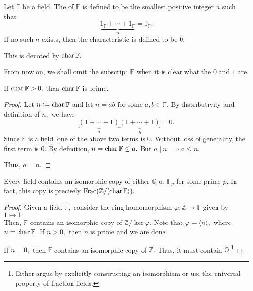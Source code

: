 \begin{defn}%
    Let $\mathbb{F}$ be a field. The  of $\mathbb{F}$ is defined to be the smallest positive integer $n$ such that
    \begin{equation*} 
        \underbrace{1_{\mathbb{F}} + \cdots + 1_{\mathbb{F}}}_{n} = 0_{\mathbb{F}}.
    \end{equation*}
    If no such $n$ exists, then the characteristic is defined to be $0.$ 

    This is denoted by $\operatorname{char} \mathbb{F}.$
\end{defn}

From now on, we shall omit the subscript $\mathbb{F}$ when it is clear what the $0$ and $1$ are.

\begin{prop}
    If $\operatorname{char} \mathbb{F} > 0,$ then $\operatorname{char} \mathbb{F}$ is prime.
\end{prop}
\begin{proof} 
    Let $n \vcentcolon= \operatorname{char} \mathbb{F}$ and let $n = ab$ for some $a, b \in \mathbb{F}.$ By distributivity and definition of $n,$ we have
    \begin{equation*} 
        \underbrace{(1 + \cdots + 1)}_{a}\underbrace{(1 + \cdots + 1)}_{b} = 0.
    \end{equation*}
    Since $\mathbb{F}$ is a field, one of the above two terms is $0.$ Without loss of generality, the first term is $0.$ By definition, $n = \operatorname{char} \mathbb{F} \le a.$ But $a \mid n \implies a \le n.$

    Thus, $a = n.$
\end{proof}

\begin{prop}
    Every field contains an isomorphic copy of either $\mathbb{Q}$ or $\mathbb{F}_p$ for some prime $p.$ In fact, this copy is precisely $\operatorname{Frac}(\mathbb{Z}/\langle \operatorname{char}\mathbb{F}\rangle).$
\end{prop}
\begin{proof} 
    Given a field $\mathbb{F},$ consider the ring homomorphism $\varphi : \mathbb{Z} \to \mathbb{F}$ given by $1 \mapsto 1.$ \\
    Then, $\mathbb{F}$ contains an isomorphic copy of $\mathbb{Z}/\ker \varphi.$ Note that $\varphi = \langle n\rangle,$ where $n = \operatorname{char}\mathbb{F}.$ If $n > 0,$ then $n$ is prime and we are done.

    If $n = 0,$ then $\mathbb{F}$ contains an isomorphic copy of $\mathbb{Z}.$ Thus, it must contain $\mathbb{Q}.$\footnote{Either argue by explicitly constructing an isomorphism or use the universal property of fraction fields.}
\end{proof}

